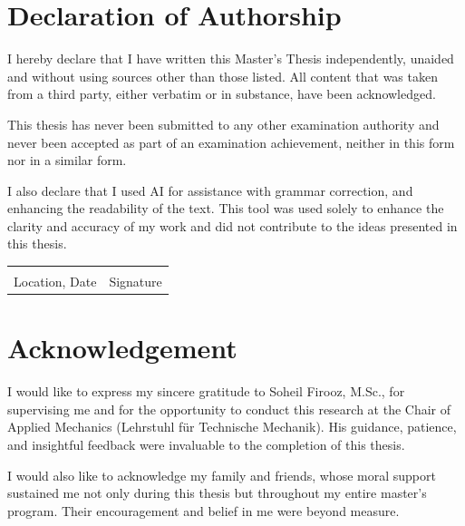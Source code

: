 \documentclass[oneside, 12pt, a4paper, bibliography=totoc]{book}
\begin{document}
\chapter*{Declaration of Authorship}
\thispagestyle{empty}

I hereby declare that I have written this Master's Thesis independently, unaided and without using sources other than those listed. All content that was taken from a third party, either verbatim or in substance, have been acknowledged. 

This thesis has never been submitted to any other examination authority and never been accepted as part of an examination achievement, neither in this form nor in a similar form.

I also declare that I used AI for assistance with grammar correction, and enhancing the readability of the text. This tool was used solely to enhance the clarity and accuracy of my work and did not contribute to the ideas presented in this thesis.

\vspace{2cm}
\noindent
\begin{tabular}{@{}p{6cm}p{6cm}@{}}
    \hrulefill & \hrulefill \\
    Location, Date & Signature
\end{tabular}

\vspace{3cm}



\chapter*{Acknowledgement}

I would like to express my sincere gratitude to Soheil Firooz, M.Sc., for supervising me and for the opportunity to conduct this research at the Chair of Applied Mechanics (Lehrstuhl für Technische Mechanik). His guidance, patience, and insightful feedback were invaluable to the completion of this thesis.

I would also like to acknowledge my family and friends, whose moral support sustained me not only during this thesis but throughout my entire master's program. Their encouragement and belief in me were beyond measure.
\end{document}
